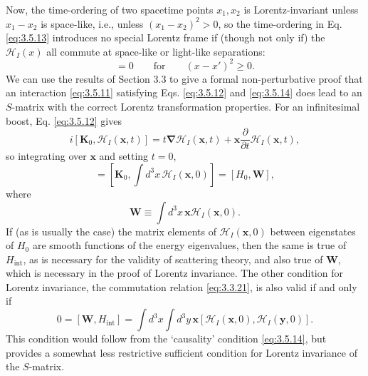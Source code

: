 Now, the time-ordering of two spacetime points $x_1,x_2$ is Lorentz-invariant unless $x_1-x_2$
is space-like, i.e., unless $(x_1-x_2)^2>0$, so the time-ordering in Eq. \eqref{eq:3.5.13} introduces
no special Lorentz frame if (though not only if) the $\mathcal{H}_I(x)$ all commute at space-like
or light-like separations:
\begin{equation}
 [\mathcal{H}_I(x),\mathcal{H}_I(x')]=0\qquad\text{for}\qquad(x-x')^2\geq0.
 \tag{3.5.14}\label{eq:3.5.14}
\end{equation}
We can use the results of Section 3.3 to give a formal non-perturbative proof that an interaction
\eqref{eq:3.5.11} satisfying Eqs. \eqref{eq:3.5.12} and \eqref{eq:3.5.14} does lead to an $S$-matrix with the correct
Lorentz transformation properties. For an infinitesimal boost, Eq. \eqref{eq:3.5.12} gives
\begin{equation}
 i[\mathbf{K}_0,\mathcal{H}_I(\mathbf{x},t)]
 =t\boldsymbol{\nabla}\mathcal{H}_I(\mathbf{x},t)
 +\mathbf{x}\frac{\partial}{\partial t}\mathcal{H}_I(\mathbf{x},t),
 \tag{3.5.15}\label{eq:3.5.15}
\end{equation}
so integrating over $\mathbf{x}$ and setting $t=0$,
\begin{equation}
 [\mathbf{K}_0,H_{\mathrm{int}}]
 =\left[\mathbf{K}_0,\int d^3x\,\mathcal{H}_I(\mathbf{x},0)\right]
 =[H_0,\mathbf{W}],
 \tag{3.5.16}\label{eq:3.5.16}
\end{equation}
where
\begin{equation}
 \mathbf{W}\equiv\int d^3x\,\mathbf{x}\mathcal{H}_I(\mathbf{x},0).
 \tag{3.5.17}\label{eq:3.5.17}
\end{equation}
If (as is usually the case) the matrix elements of $\mathcal{H}_I(\mathbf{x},0)$ between
eigenstates of $H_0$ are smooth functions of the energy eigenvalues, then the same is true of
$H_{\mathrm{int}}$, as is necessary for the validity of scattering theory, and also true of
$\mathbf{W}$, which is necessary in the proof of Lorentz invariance. The other condition for
Lorentz invariance, the commutation relation \eqref{eq:3.3.21}, is also valid if and only if
\begin{equation}
 0=[\mathbf{W},H_{\mathrm{int}}]
 =\int d^3x\int d^3y\,\mathbf{x}
 [\mathcal{H}_I(\mathbf{x},0),\mathcal{H}_I(\mathbf{y},0)].
 \tag{3.5.18}\label{eq:3.5.18}
\end{equation}
This condition would follow from the `causality' condition \eqref{eq:3.5.14}, but provides a somewhat
less restrictive sufficient condition for Lorentz invariance of the $S$-matrix.

